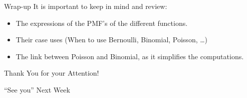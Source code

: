 \documentclass[smaller]{beamer}\usepackage[]{graphicx}\usepackage[]{color}
\begin{document}
\begin{frame}{Wrap-up}
  It is important to keep in mind and review:
  \bigskip
  \begin{itemize}
  \item The expressions of the PMF's of the different functions.
  \medskip
  \item Their case uses (When to use Bernoulli, Binomial, Poisson, \dots)
  \medskip
  \item The link between Poisson and Binomial, as it simplifies the computations.
  \end{itemize}
\end{frame}


\begin{frame}
  \begin{center}
  \Large{Thank You for your Attention!}

  \bigskip
  \pause


  \Large{``See you'' Next Week}
  \end{center}
\end{frame}
\end{document}
